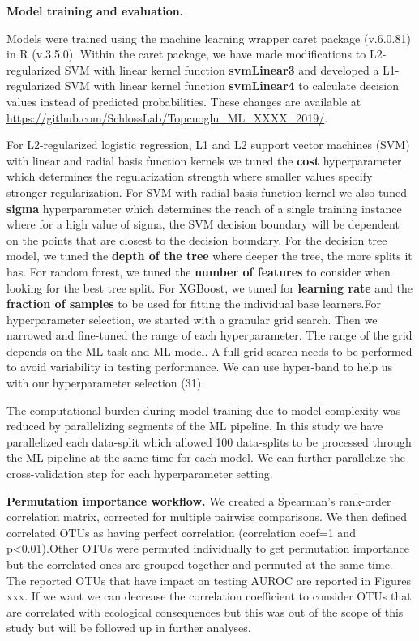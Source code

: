 \documentclass[11pt,]{article}
\begin{document}
\textbf{Model training and evaluation.}

Models were trained using the machine learning wrapper caret package
(v.6.0.81) in R (v.3.5.0). Within the caret package, we have made
modifications to L2-regularized SVM with linear kernel function
\textbf{svmLinear3} and developed a L1-regularized SVM with linear
kernel function \textbf{svmLinear4} to calculate decision values instead
of predicted probabilities. These changes are available at
\url{https://github.com/SchlossLab/Topcuoglu_ML_XXXX_2019/}.

For L2-regularized logistic regression, L1 and L2 support vector
machines (SVM) with linear and radial basis function kernels we tuned
the \textbf{cost} hyperparameter which determines the regularization
strength where smaller values specify stronger regularization. For SVM
with radial basis function kernel we also tuned \textbf{sigma}
hyperparameter which determines the reach of a single training instance
where for a high value of sigma, the SVM decision boundary will be
dependent on the points that are closest to the decision boundary. For
the decision tree model, we tuned the \textbf{depth of the tree} where
deeper the tree, the more splits it has. For random forest, we tuned the
\textbf{number of features} to consider when looking for the best tree
split. For XGBoost, we tuned for \textbf{learning rate} and the
\textbf{fraction of samples} to be used for fitting the individual base
learners.For hyperparameter selection, we started with a granular grid
search. Then we narrowed and fine-tuned the range of each
hyperparameter. The range of the grid depends on the ML task and ML
model. A full grid search needs to be performed to avoid variability in
testing performance. We can use hyper-band to help us with our
hyperparameter selection (31).

The computational burden during model training due to model complexity
was reduced by parallelizing segments of the ML pipeline. In this study
we have parallelized each data-split which allowed 100 data-splits to be
processed through the ML pipeline at the same time for each model. We
can further parallelize the cross-validation step for each
hyperparameter setting.

\textbf{Permutation importance workflow.} We created a Spearman's
rank-order correlation matrix, corrected for multiple pairwise
comparisons. We then defined correlated OTUs as having perfect
correlation (correlation coef=1 and p\textless{}0.01).Other OTUs were
permuted individually to get permutation importance but the correlated
ones are grouped together and permuted at the same time. The reported
OTUs that have impact on testing AUROC are reported in Figures xxx. If
we want we can decrease the correlation coefficient to consider OTUs
that are correlated with ecological consequences but this was out of the
scope of this study but will be followed up in further analyses.
\end{document}
